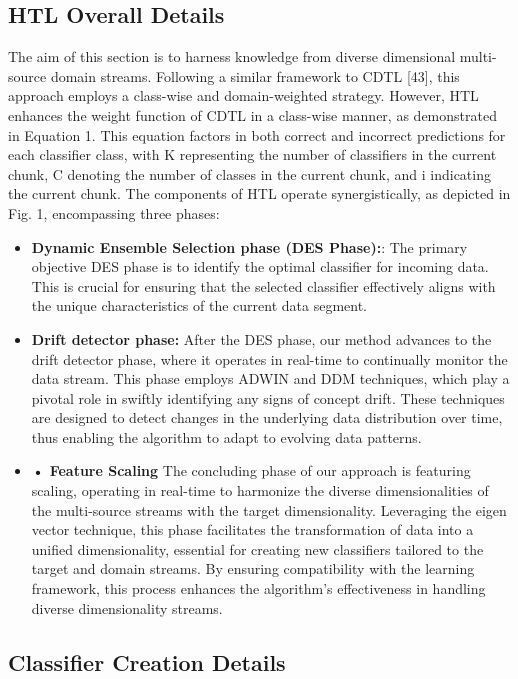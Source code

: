 \subsection{HTL Overall Details}

The aim of this section is to harness knowledge from diverse dimensional multi-source domain streams. Following a similar framework to CDTL [43], this approach employs a class-wise and domain-weighted strategy. However, HTL enhances the weight function of CDTL in a class-wise manner, as demonstrated in Equation 1. This equation factors in both correct and incorrect predictions for each classifier class, with K representing the number of classifiers in the current chunk, C denoting the number of classes in the current chunk, and i indicating the current chunk. The components of HTL operate synergistically, as depicted in Fig. 1, encompassing three phases:
\begin{itemize}
	\item \textbf{Dynamic Ensemble Selection phase (DES Phase):}: The primary objective DES phase is to identify the optimal classifier for incoming data. This is crucial for ensuring that the selected classifier effectively aligns with the unique characteristics of the current data segment.
	\item \textbf{Drift detector phase:} After the DES phase, our method advances to the drift detector phase, where it operates in real-time to continually monitor the data stream. This phase employs ADWIN and DDM techniques, which play a pivotal role in swiftly identifying any signs of concept drift. These techniques are designed to detect changes in the underlying data distribution over time, thus enabling the algorithm to adapt to evolving data patterns.
	\item \textbf{•	Feature Scaling} The concluding phase of our approach is featuring scaling, operating in real-time to harmonize the diverse dimensionalities of the multi-source streams with the target dimensionality. Leveraging the eigen vector technique, this phase facilitates the transformation of data into a unified dimensionality, essential for creating new classifiers tailored to the target and domain streams. By ensuring compatibility with the learning framework, this process enhances the algorithm's effectiveness in handling diverse dimensionality streams.
\end{itemize}
\subsection{Classifier Creation Details }

